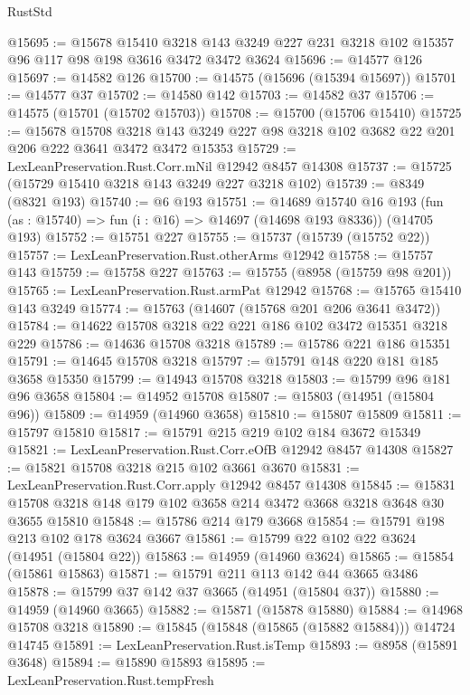 \begin{lexlean}{RustStd}
\begin{coremodule}
@15695 := @15678
    @15410
    @3218
    @143
    @3249
    @227
    @231
    @3218
    @102
    @15357
    @96
    @117
    @98
    @198
    @3616
    @3472
    @3472
    @3624
@15696 := @14577 @126
@15697 := @14582 @126
@15700 := @14575 (@15696 (@15394 @15697))
@15701 := @14577 @37
@15702 := @14580 @142
@15703 := @14582 @37
@15706 := @14575 (@15701 (@15702 @15703))
@15708 := @15700 (@15706 @15410)
@15725 := @15678
    @15708
    @3218
    @143
    @3249
    @227
    @98
    @3218
    @102
    @3682
    @22
    @201
    @206
    @222
    @3641
    @3472
    @3472
    @15353
@15729 := LexLeanPreservation.Rust.Corr.mNil @12942 @8457 @14308
@15737 := @15725 (@15729 @15410 @3218 @143 @3249 @227 @3218 @102)
@15739 := @8349 (@8321 @193)
@15740 := @6 @193
@15751 := @14689
    @15740
    @16
    @193
    (fun (as : @15740) => fun (i : @16) => @14697 (@14698 @193 @8336))
    (@14705 @193)
@15752 := @15751 @227
@15755 := @15737 (@15739 (@15752 @22))
@15757 := LexLeanPreservation.Rust.otherArms @12942
@15758 := @15757 @143
@15759 := @15758 @227
@15763 := @15755 (@8958 (@15759 @98 @201))
@15765 := LexLeanPreservation.Rust.armPat @12942
@15768 := @15765 @15410 @143 @3249
@15774 := @15763 (@14607 (@15768 @201 @206 @3641 @3472))
@15784 := @14622 @15708 @3218 @22 @221 @186 @102 @3472 @15351 @3218 @229
@15786 := @14636 @15708 @3218
@15789 := @15786 @221 @186 @15351
@15791 := @14645 @15708 @3218
@15797 := @15791 @148 @220 @181 @185 @3658 @15350
@15799 := @14943 @15708 @3218
@15803 := @15799 @96 @181 @96 @3658
@15804 := @14952 @15708
@15807 := @15803 (@14951 (@15804 @96))
@15809 := @14959 (@14960 @3658)
@15810 := @15807 @15809
@15811 := @15797 @15810
@15817 := @15791 @215 @219 @102 @184 @3672 @15349
@15821 := LexLeanPreservation.Rust.Corr.eOfB @12942 @8457 @14308
@15827 := @15821 @15708 @3218 @215 @102 @3661 @3670
@15831 := LexLeanPreservation.Rust.Corr.apply @12942 @8457 @14308
@15845 := @15831 @15708 @3218 @148 @179 @102 @3658 @214 @3472 @3668 @3218 @3648 @30 @3655 @15810
@15848 := @15786 @214 @179 @3668
@15854 := @15791 @198 @213 @102 @178 @3624 @3667
@15861 := @15799 @22 @102 @22 @3624 (@14951 (@15804 @22))
@15863 := @14959 (@14960 @3624)
@15865 := @15854 (@15861 @15863)
@15871 := @15791 @211 @113 @142 @44 @3665 @3486
@15878 := @15799 @37 @142 @37 @3665 (@14951 (@15804 @37))
@15880 := @14959 (@14960 @3665)
@15882 := @15871 (@15878 @15880)
@15884 := @14968 @15708 @3218
@15890 := @15845 (@15848 (@15865 (@15882 @15884))) @14724 @14745
@15891 := LexLeanPreservation.Rust.isTemp
@15893 := @8958 (@15891 @3648)
@15894 := @15890 @15893
@15895 := LexLeanPreservation.Rust.tempFresh

\end{coremodule}
\end{lexlean}
